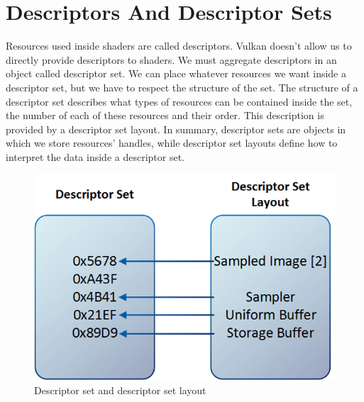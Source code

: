 \section{Descriptors And Descriptor Sets}

Resources used inside shaders are called descriptors.
Vulkan doesn't allow us to directly provide descriptors to shaders.
We must aggregate descriptors in an object called descriptor set.
We can place whatever resources we want inside a descriptor set,
but we have to respect the structure of the set.
The structure of a descriptor set describes what types of resources
can be contained inside the set, the number of each of these resources and
their order.
This description is provided by a descriptor set layout.
In summary, descriptor sets are objects in which we store resources' handles,
while descriptor set layouts define how to interpret the data inside a
descriptor set.

\begin{figure}[H]
    \centering
    \includegraphics[scale=0.30]{images/ApVulkanConcepts/DescriptorSetAndSetLayout.png}
    \caption{Descriptor set and descriptor set layout}
    \label{fig::DescriptorSetAndSetLaytout}
\end{figure}
